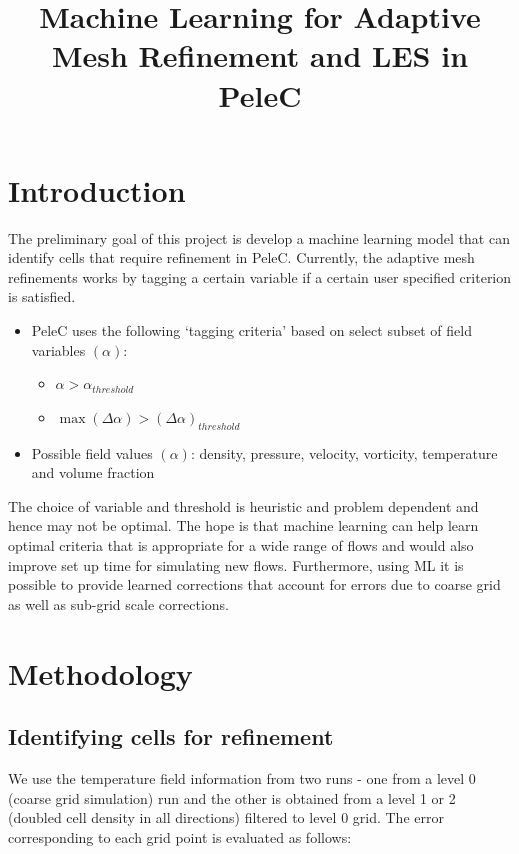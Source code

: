 \documentclass{article}
\title{Machine Learning for Adaptive Mesh Refinement and LES in PeleC}
\begin{document}
\maketitle

\section{Introduction}

The preliminary goal of this project is develop a machine learning model that can identify cells that require refinement in PeleC. Currently, the adaptive mesh refinements works by tagging a certain variable if a certain user specified criterion is satisfied. 

\begin{itemize}
 				\item PeleC uses the following `tagging criteria'  based on select subset of field variables $(\alpha)$:
 				\begin{itemize}
 					\item $\alpha>\alpha_{threshold}$
 					\item $\max(\Delta \alpha) >(\Delta \alpha)_{threshold}$
 				\end{itemize}	
 				\item Possible field values $(\alpha)$: density, pressure, velocity, vorticity, temperature and volume fraction 				
 			\end{itemize}
 			
The choice of variable and threshold is heuristic and problem dependent and hence may not be optimal. The hope is that machine learning can help learn optimal criteria that is appropriate for a wide range of flows and would also improve set up time for simulating new flows. Furthermore, using ML it is possible to provide learned corrections that account for errors due to coarse grid as well as sub-grid scale corrections.

\section{Methodology}

\subsection{Identifying cells for refinement}

We use the temperature field information from two runs - one from a level 0 (coarse grid simulation) run and the other is obtained from a level 1 or 2 (doubled cell density in all directions) filtered to level 0 grid. The error corresponding to each grid point is evaluated as follows: 
\end{document}
